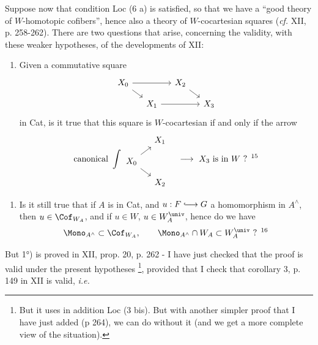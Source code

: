 Suppose now that condition Loc (6 a) is satisfied, so that we have a ``good theory of $W$-homotopic cofibers'', hence also a theory of $W$-cocartesian squares (\textit{cf.} XII, p. 258-262). There are two questions that arise, concerning the validity, with these weaker hypotheses, of the developments of XII:
\begin{enumerate}
\item[1°)] Given a commutative square
\[
\begin{tikzcd}[ampersand replacement=\&, row sep=small, column sep=small]
X_0 \arrow[rr] \arrow[dr] \& \& X_2 \arrow[dr] \& \\
\& X_1 \arrow[rr] \& \& X_3
\end{tikzcd}
\]
in Cat, is it true that this square is $W$-cocartesian if and only if the arrow
\[
\text{canonical}\ \displaystyle\int
\begin{tikzcd}[ampersand replacement=\&, row sep=small, column sep=small]
\& X_1 \\
X_0 \arrow[ur] \arrow[dr] \& \\
\& X_2
\end{tikzcd}
\quad \longrightarrow \ X_3 \text{ is in } W \text{ ? }\text{\footnotemark[15]}
\]
\end{enumerate}
\begin{enumerate}
\item[2°)] Is it still true that if $A$ is in Cat, and $u : F \lhook\joinrel\longrightarrow G$ a homomorphism in $A^{\wedge}$, then $u \in \Cof_{W_A}$, and if $u \in W$, $u \in W_A^{\univ}$, hence do we have
\[
\Mono_{A^{\wedge}} \subset \Cof_{W_A}, \qquad \Mono_{A^{\wedge}} \cap W_A \subset W_A^{\univ} \text{ ? }\text{\footnotemark[16]}
\]
\end{enumerate}
But 1°) is proved in XII, prop. 20, p. 262 - I have just checked that the proof is valid under the present hypotheses \footnote[17]{But it uses in addition Loc (3 bis). But with another simpler proof that I have just added (p 264), we can do without it (and we get a more complete view of the situation).}, provided that I check that corollary 3, p. 149 in XII is valid, \textit{i.e.} %
